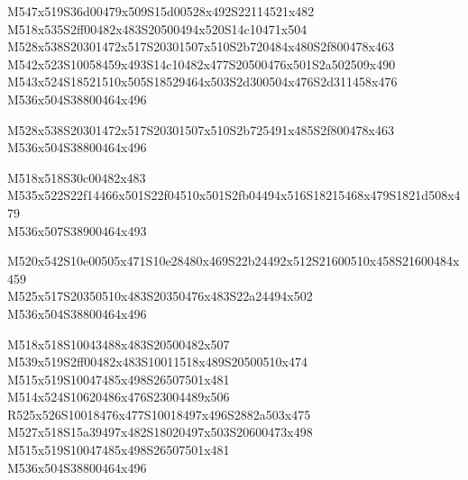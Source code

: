 \documentclass{article}
\begin{document}
\begin{multicols}{5}
\begin{center}
M547x519S36d00479x509S15d00528x492S22114521x482 %
\\M518x535S2ff00482x483S20500494x520S14c10471x504 %
\\M528x538S20301472x517S20301507x510S2b720484x480S2f800478x463 %
\\M542x523S10058459x493S14c10482x477S20500476x501S2a502509x490 %
\\M543x524S18521510x505S18529464x503S2d300504x476S2d311458x476 %
\\M536x504S38800464x496 %

M528x538S20301472x517S20301507x510S2b725491x485S2f800478x463 %
\\M536x504S38800464x496 %

M518x518S30c00482x483 %
\\M535x522S22f14466x501S22f04510x501S2fb04494x516S18215468x479S1821d508x479 %
\\M536x507S38900464x493 %

M520x542S10e00505x471S10e28480x469S22b24492x512S21600510x458S21600484x459 %
\\M525x517S20350510x483S20350476x483S22a24494x502 %
\\M536x504S38800464x496 %

M518x518S10043488x483S20500482x507 %
\\M539x519S2ff00482x483S10011518x489S20500510x474 %
\\M515x519S10047485x498S26507501x481 %
\\M514x524S10620486x476S23004489x506 %
\\R525x526S10018476x477S10018497x496S2882a503x475 %
\\M527x518S15a39497x482S18020497x503S20600473x498 %
\\M515x519S10047485x498S26507501x481 %
\\M536x504S38800464x496 %

\end{center}
\end{multicols}
\end{document}
